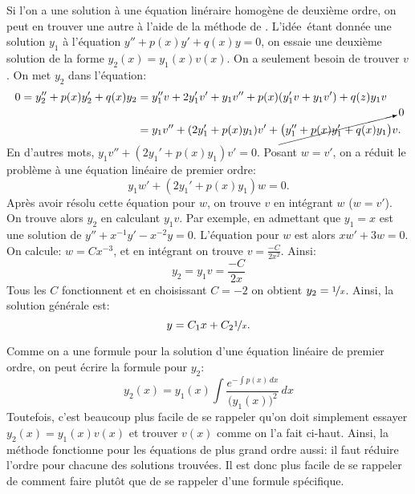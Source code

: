 \medskip

Si l'on a une solution à une équation linéraire homogène de deuxième ordre, on peut en trouver une autre à l'aide de la méthode de  \emph{}.  L'idée\, étant donnée une solution $y_1$ à l'équation
$y'' + p(x) y' + q(x) y = 0$, on essaie une deuxième solution de la forme $y_2(x) = y_1(x) v(x)$.
On a seulement besoin de trouver $v$.  On met $y_2$ dans l'équation:
\begin{equation*}
\begin{split}
0 = 
y_2'' + p(x) y_2' + q(x) y_2 & =
y_1'' v + 2 y_1' v' + y_1 v''
+ p(x) ( y_1' v + y_1 v' )
+ q(z) y_1 v
\\
& =
y_1 v''
+ (2 y_1' + p(x) y_1) v'
+
\cancelto{0}{\bigl( y_1'' + p(x) y_1' + q(x) y_1 \bigr)} v .
\end{split}
\end{equation*}
En d'autres mots, 
$y_1 v'' + (2 y_1' + p(x) y_1) v' = 0$.  Posant $w = v'$, on a réduit le problème à une équation linéaire de premier ordre:
\begin{equation*}
y_1 w' + (2 y_1' + p(x) y_1) w = 0.
\end{equation*}
%
Après avoir résolu cette équation pour $w$,
on trouve $v$ en intégrant $w$ ($w=v'$).  On trouve alors $y_2$ en calculant
$y_1 v$.  Par exemple, en admettant que $y_1 = x$ est une solution
de $y''+x^{-1}y'-x^{-2} y=0$.
L'équation pour $w$ est alors
$xw' + 3 w = 0$.  On calcule: $w = Cx^{-3}$, et en intégrant on trouve  $v = \frac{-C}{2x^2}$.
Ainsi:
\begin{equation*}
y_2 = y_1 v = \frac{-C}{2x}
\end{equation*}
%
Tous les $C$ fonctionnent et en choisissant $C=-2$ on obtient $y_2 = \nicefrac{1}{x}$.  Ainsi, la solution générale est:
\begin{equation*}
y = C_1 x + C_2\nicefrac{1}{x}.
\end{equation*}

Comme on a une formule pour la solution d'une équation linéaire de premier ordre, on peut écrire la formule pour $y_2$:
\begin{equation*}
y_2(x) = y_1(x) \int \frac{e^{-\int p(x)\,dx}}{{\bigl(y_1(x)\bigr)}^2} \,dx
\end{equation*}
Toutefois, c'est beaucoup plus facile de se rappeler qu'on doit simplement essayer $y_2(x) =
y_1(x) v(x)$ et trouver $v(x)$ comme on l'a fait ci-haut.  Ainsi, la méthode fonctionne pour les équations de plus grand ordre aussi: il faut réduire l'ordre pour chacune des solutions trouvées. Il est donc plus facile de se rappeler de comment faire plutôt que de se rappeler d'une formule spécifique. 

